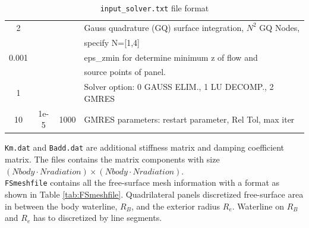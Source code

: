 \documentclass[12pt,a4paper,titlepage]{article}
\begin{document}
\begin{table}[ht]
\begin{center}
\caption{\texttt{input\_solver.txt} file format}\label{tab:input_solver}
\begin{tabular}{cccl}
\hline
2&\ &\ & Gauss quadrature (GQ) surface integration, $N^2$ GQ Nodes,\\
\ &\ &\ &  specify N=[1,4] \\
\hline
0.001 &\ &\ &  eps\_zmin for determine minimum z of flow and \\
\ &\ &\ & source points of panel.\\
\hline
1 &\ &\  & Solver option: 0 GAUSS ELIM., 1 LU DECOMP., 2 GMRES \\
\hline
10 & 1e-5& 1000 & GMRES parameters: restart parameter, Rel Tol, max iter\\
\hline
\end{tabular}
\end{center}
\end{table}

\noindent
\texttt{Km.dat} and \texttt{Badd.dat} are additional stiffness matrix and damping coefficient matrix. The files contains the matrix components with size $(Nbody\cdot Nradiation)\times (Nbody\cdot Nradiation)$.\\

\noindent
\texttt{FSmeshfile} contains all the free-surface mesh information with a format as shown in Table \ref{tab:FSmeshfile}. Quadrilateral panels discretized free-surface area in between the body waterline, $R_B$, and the exterior radius $R_e$. Waterline on $R_B$ and $R_e$ has to discretized by line segments.
\end{document}
